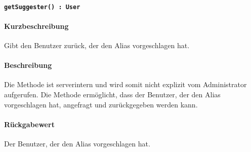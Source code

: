 \paragraph{\texttt{getSuggester() : User}}%
\paragraph*{Kurzbeschreibung}
Gibt den Benutzer zurück, der den Alias vorgeschlagen hat.
\paragraph*{Beschreibung}
Die Methode ist serverintern und wird somit nicht explizit vom Administrator aufgerufen.
Die Methode ermöglicht, dass der Benutzer, der den Alias vorgeschlagen hat, angefragt und zurückgegeben werden kann.
\paragraph*{Rückgabewert}
Der Benutzer, der den Alias vorgeschlagen hat.
